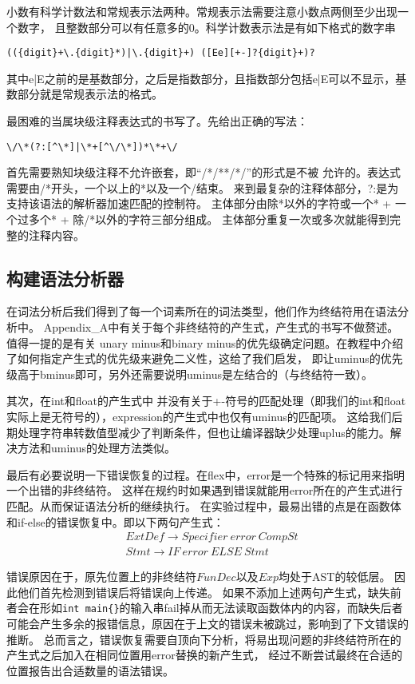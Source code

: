 \documentclass[twocolumn]{article}
\begin{document}
小数有科学计数法和常规表示法两种。常规表示法需要注意小数点两侧至少出现一个数字，
且整数部分可以有任意多的0。科学计数表示法是有如下格式的数字串
\begin{lstlisting}[style=style1]
 (({digit}+\.{digit}*)|\.{digit}+) ([Ee][+-]?{digit}+)?
\end{lstlisting}
其中e|E之前的是基数部分，之后是指数部分，且指数部分包括e|E可以不显示，基数部分就是常规表示法的格式。

最困难的当属块级注释表达式的书写了。先给出正确的写法：
\begin{lstlisting}[style=style1]
 \/\*(?:[^\*]|\*+[^\/\*])*\*+\/
\end{lstlisting}
首先需要熟知块级注释不允许嵌套，即“/*/**/*/”的形式是不被
允许的。表达式需要由/*开头，一个以上的*以及一个/结束。
来到最复杂的注释体部分，?:是为支持该语法的解析器加速匹配的控制符。
主体部分由除*以外的字符或一个* + 一个过多个* + 除/*以外的字符三部分组成。
主体部分重复一次或多次就能得到完整的注释内容。

\subsection{构建语法分析器}
在词法分析后我们得到了每一个词素所在的词法类型，他们作为终结符用在语法分析中。
Appendix\_A中有关于每个非终结符的产生式，产生式的书写不做赘述。值得一提的是有关
unary minus和binary minus的优先级确定问题。在教程中介绍了如何指定产生式的优先级来避免二义性，这给了我们启发，
即让uminus的优先级高于bminus即可，另外还需要说明uminus是左结合的（与终结符一致）。

其次，在int和float的产生式中
并没有关于+-符号的匹配处理（即我们的int和float实际上是无符号的），expression的产生式中也仅有uminus的匹配项。
这给我们后期处理字符串转数值型减少了判断条件，但也让编译器缺少处理uplus的能力。解决方法和uminus的处理方法类似。

最后有必要说明一下错误恢复的过程。在flex中，error是一个特殊的标记用来指明一个出错的非终结符。
这样在规约时如果遇到错误就能用error所在的产生式进行匹配。从而保证语法分析的继续执行。
在实验过程中，最易出错的点是在函数体和if-else的错误恢复中。即以下两句产生式：
$$
    \begin{aligned}
         & ExtDef \to Specifier\ error\ CompSt \\
         & Stmt \to IF\ error\ ELSE\ Stmt
    \end{aligned}
$$

错误原因在于，原先位置上的非终结符$FunDec$以及$Exp$均处于AST的较低层。
因此他们首先检测到错误后将错误向上传递。
如果不添加上述两句产生式，缺失前者会在形如\verb|int main{}|的输入串fail掉从而无法读取函数体内的内容，而缺失后者
可能会产生多余的报错信息，原因在于上文的错误未被跳过，影响到了下文错误的推断。
总而言之，错误恢复需要自顶向下分析，将易出现问题的非终结符所在的产生式之后加入在相同位置用error替换的新产生式，
经过不断尝试最终在合适的位置报告出合适数量的语法错误。
\end{document}
